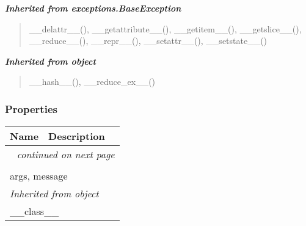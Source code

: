 \large{\textbf{\textit{Inherited from exceptions.BaseException}}}

\begin{quote}
\_\_delattr\_\_(), \_\_getattribute\_\_(), \_\_getitem\_\_(), \_\_getslice\_\_(), \_\_reduce\_\_(), \_\_repr\_\_(), \_\_setattr\_\_(), \_\_setstate\_\_()
\end{quote}

\large{\textbf{\textit{Inherited from object}}}

\begin{quote}
\_\_hash\_\_(), \_\_reduce\_ex\_\_()
\end{quote}


  \subsubsection{Properties}

    \vspace{-1cm}
\hspace{\varindent}\begin{longtable}{|p{\varnamewidth}|p{\vardescrwidth}|l}
\cline{1-2}
\cline{1-2} \centering \textbf{Name} & \centering \textbf{Description}& \\
\cline{1-2}
\endhead\cline{1-2}\multicolumn{3}{r}{\small\textit{continued on next page}}\\\endfoot\cline{1-2}
\endlastfoot\multicolumn{2}{|l|}{\textit{Inherited from exceptions.BaseException}}\\
\multicolumn{2}{|p{\varwidth}|}{\raggedright args, message}\\
\cline{1-2}
\multicolumn{2}{|l|}{\textit{Inherited from object}}\\
\multicolumn{2}{|p{\varwidth}|}{\raggedright \_\_class\_\_}\\
\cline{1-2}
\end{longtable}



